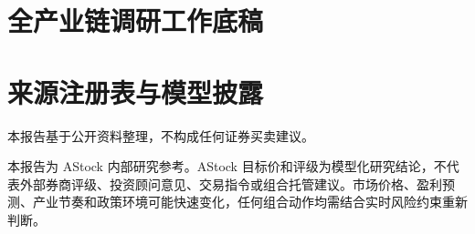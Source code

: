 \documentclass[a4paper,11pt,openany,fontset=none]{ctexrep}
\newcommand{\reportdisclaimer}{本报告基于公开资料整理，不构成任何证券买卖建议。}
\begin{document}
\chapter{全产业链调研工作底稿}

\chapter{来源注册表与模型披露}


\clearpage
\thispagestyle{empty}
\vspace*{4cm}
\begin{disclosurebox}[免责声明]
\small
\reportdisclaimer\par
本报告为 AStock 内部研究参考。AStock 目标价和评级为模型化研究结论，不代表外部券商评级、投资顾问意见、交易指令或组合托管建议。市场价格、盈利预测、产业节奏和政策环境可能快速变化，任何组合动作均需结合实时风险约束重新判断。
\end{disclosurebox}
\end{document}
